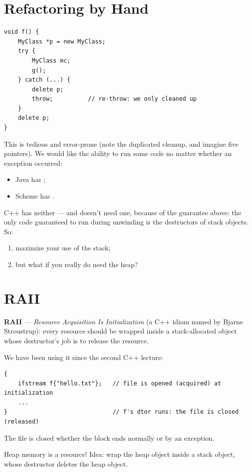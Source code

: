 \section{Refactoring by Hand}
\begin{lstlisting}[style=cpp]
void f() {
    MyClass *p = new MyClass;
    try {
        MyClass mc;
        g();
    } catch (...) {
        delete p;
        throw;          // re-throw: we only cleaned up
    }
    delete p;
}
\end{lstlisting}
This is tedious and error-prone (note the duplicated cleanup, and imagine five
pointers). We would like the ability to run some code no matter whether an
exception occurred:
\begin{itemize}
  \item Java has ;
  \item Scheme has .
\end{itemize}
C++ has neither --- and doesn't need one, because of the guarantee above: the
only code guaranteed to run during unwinding is the destructors of stack
objects. So:
\begin{enumerate}
  \item maximize your use of the stack;
  \item but what if you really do need the heap?
\end{enumerate}

\section{RAII}
\begin{definition}
\textbf{RAII} --- \emph{Resource Acquisition Is Initialization} (a C++ idiom
named by Bjarne Stroustrup): every resource should be wrapped inside a
stack-allocated object whose destructor's job is to release the resource.
\end{definition}
We have been using it since the second C++ lecture:
\begin{lstlisting}[style=cpp]
{
    ifstream f{"hello.txt"};   // file is opened (acquired) at initialization
    ...
}                              // f's dtor runs: the file is closed (released)
\end{lstlisting}
The file is closed whether the block ends normally or by an exception.

Heap memory is a resource! Idea: wrap the heap object inside a stack object,
whose destructor deletes the heap object.

